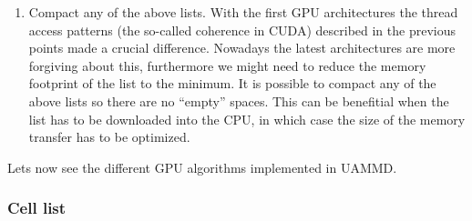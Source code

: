 \documentclass[ twoside,openright,titlepage,numbers=noenddot,%
headinclude,footinclude,cleardoublepage=empty,abstract=on,
BCOR=5mm,paper=a4,fontsize=11pt, dvipsnames
]{scrreprt}
\newcommand{\uammd}{\gls{UAMMD}\xspace}
\newcommand{\gpu}{\gls{GPU}\xspace}
\begin{document}
\begin{enumerate}
\item Compact any of the above lists.
  With the first \gpu architectures the thread access patterns (the so-called coherence in CUDA) described in the previous points made a crucial difference. Nowadays the latest architectures are more forgiving about this, furthermore we might need to reduce the memory footprint of the list to the minimum. It is possible to compact any of the above lists so there are no ``empty'' spaces. This can be benefitial when the list has to be downloaded into the CPU, in which case the size of the memory transfer has to be optimized.
\end{enumerate}

Lets now see the different \gpu algorithms implemented in \uammd.

\subsubsection{Cell list}\label{sec:celllist}
\end{document}
